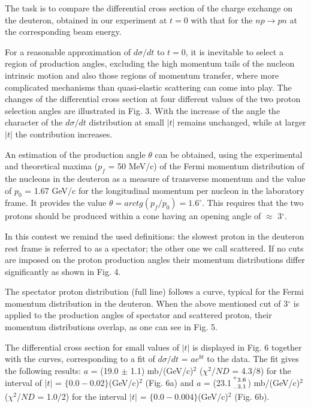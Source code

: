 The task is to compare the differential cross section
of the charge exchange on the deuteron, obtained in our experiment at $t=0$ with
that for the $np\to pn$ at the corresponding beam energy.

For a reasonable approximation of $d\sigma/dt$ to $t=0$, it is inevitable
to select a region of production angles, excluding the high momentum
tails of the nucleon intrinsic motion and also those regions of momentum
transfer, where more complicated mechanisms than  quasi-elastic
scattering can come into play. The changes of the differential cross section
 at four different values of the two proton selection angles are
illustrated in Fig. 3. With the increase of the angle the character
of the $d\sigma/dt$  distribution at small $\vert t \vert$ remains unchanged,
while at  larger $\vert t \vert$
the contribution increases.

An estimation of the production angle $\theta$ can be obtained, using
the experimental and theoretical maxima ($p_f$ = 50 MeV/c) of the Fermi
 momentum distribution of the nucleons in the deuteron as a measure
of transverse momentum and the value of $p_0$ = 1.67 GeV/c for
 the longitudinal momentum per nucleon
in the laboratory frame. It provides the
value
$\theta=arctg(p_f/p_0)=1.6^{\circ}$. This requires that the two protons
should be produced within a cone having an opening angle of
$\approx$ 3$^{\circ}$.

In this contest we remind the used definitions: the slowest proton
in the deuteron rest frame
is referred to as a spectator; the other one we call scattered. If
no cuts are imposed on the proton production angles their momentum
distributions differ significantly  as  shown in Fig. 4.

 The spectator
proton distribution (full line) follows a curve, typical for the Fermi
momentum distribution in the deuteron. When the above
mentioned cut of 3$^\circ$ is applied to the production angles
of spectator and scattered
proton, their momentum distributions overlap, as one can see
 in Fig. 5.

The differential cross section for small values of $\vert t\vert$ is
displayed in Fig. 6 together with the curves, corresponding to a fit
of $d\sigma/dt$ = $ae^{bt}$ to the data.
 The fit gives the
following results: $a$ = (19.0 $\pm$ 1.1) mb/(GeV/c)$^2$
($\chi^2$/$ND$ = 4.3/8) for the interval of
 $\vert t\vert$ = $\lbrace 0.0-0.02\rbrace$(GeV/c)$^2$ (Fig. 6a)
 and  $a$ = (23.1${^+3.6 \atop _ -3.1}$) mb/(GeV/c)$^2$
($\chi^2$/$ND$ = 1.0/2)
for the interval
 $\vert t\vert$ = $\lbrace 0.0-0.004 \rbrace$(GeV/c)$^2$ (Fig. 6b).

